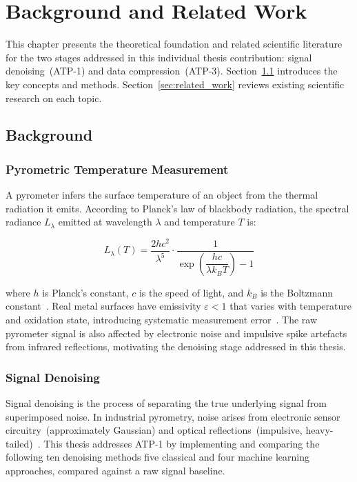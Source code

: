\chapter{Background and Related Work}
\label{cha:background}

This chapter presents the theoretical foundation and related scientific literature for the two stages addressed in this individual thesis contribution: signal denoising~(ATP-1) and data compression~(ATP-3). Section~\ref{sec:background} introduces the key concepts and methods. Section~\ref{sec:related_work} reviews existing scientific research on each topic.

\section{Background}
\label{sec:background}

\subsection{Pyrometric Temperature Measurement}

A pyrometer infers the surface temperature of an object from the thermal radiation it emits. According to Planck's law of blackbody radiation, the spectral radiance $L_\lambda$ emitted at wavelength $\lambda$ and temperature $T$ is:

\begin{equation}
L_\lambda(T) = \frac{2hc^2}{\lambda^5} \cdot \frac{1}{\exp\!\left(\dfrac{hc}{\lambda k_B T}\right) - 1}
\label{eq:planck}
\end{equation}

where $h$ is Planck's constant, $c$ is the speed of light, and $k_B$ is the Boltzmann constant~\cite{optical_pyrometer_validation}. Real metal surfaces have emissivity $\varepsilon < 1$ that varies with temperature and oxidation state, introducing systematic measurement error~\cite{emissivity_measurement}. The raw pyrometer signal is also affected by electronic noise and impulsive spike artefacts from infrared reflections, motivating the denoising stage addressed in this thesis.

\subsection{Signal Denoising}
\label{subsec:denoising_bg}

Signal denoising is the process of separating the true underlying signal from superimposed noise. In industrial pyrometry, noise arises from electronic sensor circuitry~(approximately Gaussian) and optical reflections~(impulsive, heavy-tailed)~\cite{kalman_wavelet_denoising}. This thesis addresses ATP-1 by implementing and comparing the following ten denoising methods five classical and four machine learning approaches, compared against a raw signal baseline.

